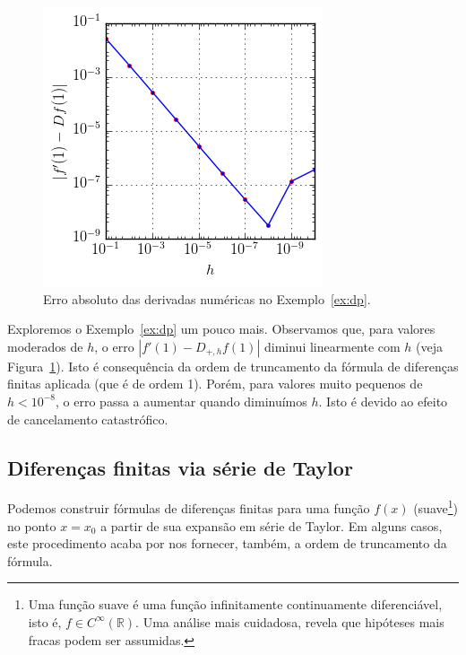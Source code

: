 \begin{figure}
  \centering
  \includegraphics{./cap_derivacao/pics/ex_derivacao/ex_derivacao}
  \caption{Erro absoluto das derivadas numéricas no Exemplo~\ref{ex:dp}.}
  \label{fig:ex_derivacao}
\end{figure}

Exploremos o Exemplo~\ref{ex:dp} um pouco mais. Observamos que, para valores moderados de $h$, o erro $|f'(1)-D_{+,h}f(1)|$ diminui linearmente com $h$ (veja Figura~\ref{fig:ex_derivacao}). Isto é consequência da ordem de truncamento da fórmula de diferenças finitas aplicada (que é de ordem 1). Porém, para valores muito pequenos de $h < 10^{-8}$, o erro passa a aumentar quando diminuímos $h$. Isto é devido ao efeito de cancelamento catastrófico.

\subsection{Diferenças finitas via série de Taylor}

Podemos construir fórmulas de diferenças finitas para uma função $f(x)$ (suave\footnote{Uma função suave é uma função infinitamente continuamente diferenciável, isto é, $f\in C^\infty(\mathbb{R})$. Uma análise mais cuidadosa, revela que hipóteses mais fracas podem ser assumidas.}) no ponto $x = x_0$ a partir de sua expansão em série de Taylor. Em alguns casos, este procedimento acaba por nos fornecer, também, a ordem de truncamento da fórmula.

